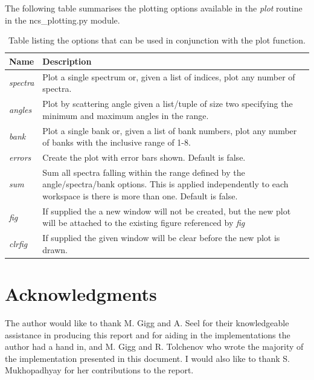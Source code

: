 \documentclass[paper=a4, fontsize=11pt]{scrartcl}	%
\numberwithin{equation}{section}															%
\numberwithin{figure}{section}																%
\numberwithin{table}{section}
\begin{document}
\begin{appendices}
The following table summarises the plotting options available in the \textit{plot} routine in the ncs\_plotting.py module.
\begin{table}[H]
\centering
\begin{tabular}{ l p{15cm}}
Name & Description \\ \hline
\textit{spectra} & Plot a single spectrum or, given a list of indices, plot any number of spectra. \\ \hline
\textit{angles} & Plot by scattering angle given a list/tuple of size two specifying the minimum and maximum angles in the range. \\ \hline
\textit{bank} & Plot a single bank or, given a list of bank numbers, plot any number of banks with the inclusive range of 1-8. \\ \hline
\textit{errors} & Create the plot with error bars shown. Default is false. \\ \hline
\textit{sum} & Sum all spectra falling within the range defined by the angle/spectra/bank options. This is applied independently to each workspace is there is more than one. Default is false.\\ \hline
\textit{fig} & If supplied the a new window will not be created, but the new plot will be attached to the existing figure referenced by \textit{fig}\\ \hline
\textit{clrfig} & If supplied the given window will be clear before the new plot is drawn. \\ \hline
\end{tabular}
\caption{Table listing the options that can be used in conjunction with the plot function.}
\label{table:plotting-parameters}
\end{table}

\section*{Acknowledgments}
The author would like to thank M. Gigg and A. Seel for their knowledgeable assistance in producing this report and for aiding in the implementations the author had a hand in, and M. Gigg and R. Tolchenov who wrote the majority of the implementation presented in this document. I would also like to thank S. Mukhopadhyay for her contributions to the report.
\end{appendices}


\end{document}
